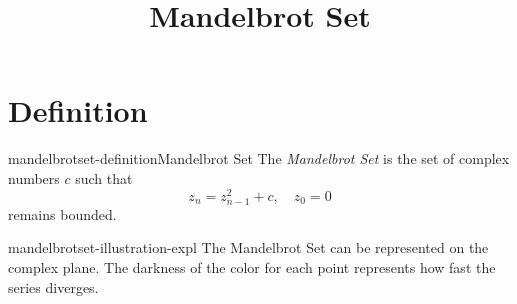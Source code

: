 \documentclass[preview]{standalone}
\begin{document}
\title{Mandelbrot Set}
\genpage

\section{Definition}

\begin{snippetdefinition}{mandelbrotset-definition}{Mandelbrot Set}{
    The \textit{Mandelbrot Set} is the set of complex numbers \(c\) such that
    \[
        z_n = z_{n-1}^2 + c,\quad z_0=0
    \]
    remains bounded.
}
\end{snippetdefinition}

\begin{snippet}{mandelbrotset-illustration-expl}
The Mandelbrot Set can be represented on the complex plane.
The darkness of the color for each point
represents how fast the series diverges.
\end{snippet}

\end{document}
